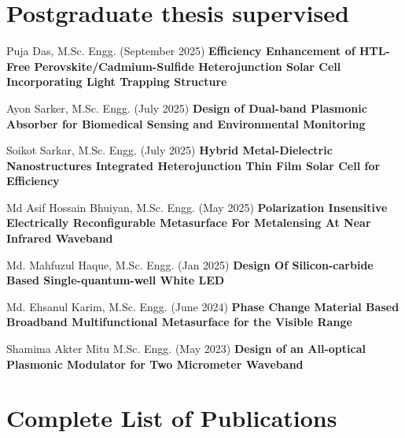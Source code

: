 \documentclass[cvauthor={Dr. Sajid Muhaimin Choudhury}]{buetcv}
\begin{document}







\section{Postgraduate thesis supervised}
\vspace{0.2 cm}
\begin{highlights}
    \item Puja Das, M.Sc. Engg. (September 2025) \textbf{Efficiency Enhancement of HTL-Free Perovskite/Cadmium-Sulfide Heterojunction Solar Cell Incorporating Light Trapping Structure}
    \item Ayon Sarker, M.Sc. Engg. (July 2025)  \textbf{Design of Dual-band Plasmonic Absorber for Biomedical Sensing and Environmental Monitoring}
    \item Soikot Sarkar, M.Sc. Engg. (July 2025) \textbf{Hybrid Metal-Dielectric Nanostructures Integrated Heterojunction Thin Film Solar Cell for Efficiency}
    \item Md Asif Hossain Bhuiyan, M.Sc. Engg. (May 2025) \textbf{Polarization Insensitive Electrically Reconfigurable Metasurface For Metalensing At Near Infrared Waveband}
    \item Md. Mahfuzul Haque,  M.Sc. Engg. (Jan 2025) \textbf{Design Of Silicon-carbide Based Single-quantum-well White LED}
    \item Md. Ehsanul Karim, M.Sc. Engg. (June 2024) \textbf{Phase Change Material Based Broadband Multifunctional Metasurface for the Visible Range}
    \item Shamima Akter Mitu M.Sc. Engg. (May 2023) \textbf{Design of an All-optical Plasmonic Modulator for Two Micrometer Waveband}
\end{highlights}        
\clearpage
\section{Complete List of Publications}
\vspace{0.2 cm}
\end{document}
